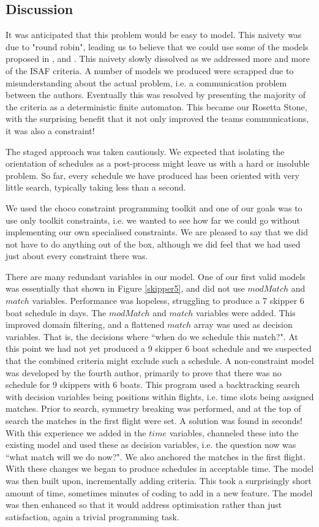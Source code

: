 \documentclass{llncs}
\begin{document}
\subsection{Discussion}
It was anticipated that this problem would be easy to model. This naivety was due to "round robin", leading us to believe that we could use some of the models proposed in \cite{trick2002}, \cite{trick2008} and \cite{henz2004}. This naivety slowly dissolved as we addressed more and more of the ISAF criteria. A number of models we produced were scrapped due to misunderstanding about the actual problem, i.e. a communication problem between the authors. Eventually this was resolved by presenting the majority of the criteria as a deterministic finite automaton. This became our Rosetta Stone, with the surprising benefit that it not only improved the teams communications, it was also a constraint!

The staged approach was taken cautiously. We expected that isolating the orientation of schedules as a post-process might leave us with a hard or insoluble problem. So far, every schedule we have produced has been oriented with very little search, typically taking less than a second.

We used the choco constraint programming toolkit and one of our goals was to use only toolkit constraints, i.e. we wanted to see how far we could go without implementing our own specialised constraints. We are pleased to say that we did not have to do anything out of the box, although we did feel that we had used just about every constraint there was.

There are many redundant variables in our model. One of our first valid models was essentially that shown in Figure \ref{skipper5}, and did not use $modMatch$ and $match$ variables. Performance was hopeless, struggling to produce a 7 skipper 6 boat schedule in days. The $modMatch$ and $match$ variables were added. This improved domain filtering, and a flattened $match$ array was used as decision variables. That is, the decisions where ``when do we schedule this match?".  At this point we had not yet produced a 9 skipper 6 boat schedule and we suspected that the combined criteria might exclude such a schedule. A non-constraint model was developed by the fourth author, primarily to prove that there was no schedule for 9 skippers with 6 boats. This program used a backtracking search with decision variables being positions within flights, i.e. time slots being assigned matches. Prior to search, symmetry breaking was performed, and at the top of search the matches in the first flight were set. A solution was found in seconds! With this experience we added in the $time$ variables, channeled these into the existing model and used these as decision variables, i.e. the question now was ``what match will we do now?". We also anchored the matches in the first flight. With these changes we began to produce schedules in acceptable time. The model was then built upon, incrementally adding criteria. This took a surprisingly short amount of time, sometimes minutes of coding to add in a new feature. The model was then enhanced so that it would address optimisation rather than just satisfaction, again a trivial programming task.
\end{document}
